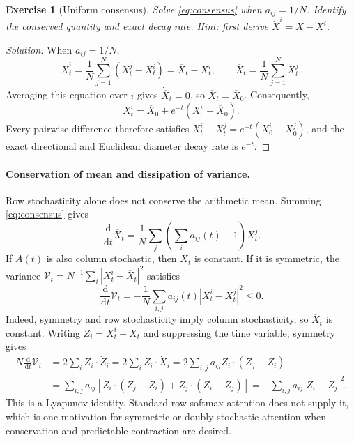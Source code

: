 \documentclass[11pt]{amsart}
\numberwithin{equation}{section}
\theoremstyle{plain}
\newtheorem{exercise}[theorem]{Exercise}
\newcommand{\dd}{\,\mathrm{d}}
\newcommand{\abs}[1]{\left\lvert#1\right\rvert}
\begin{document}
\begin{exercise}[Uniform consensus]
Solve \eqref{eq:consensus} when $a_{ij}=1/N$.  Identify the conserved quantity
and exact decay rate.  \emph{Hint:} first derive
$\dot X^i=\overline X-X^i$.
\end{exercise}
\begin{proof}[Solution]
When $a_{ij}=1/N$,
\[
 \dot X_t^i=\frac1N\sum_{j=1}^N(X_t^j-X_t^i)
 =\overline X_t-X_t^i,
 \qquad
 \overline X_t=\frac1N\sum_{j=1}^NX_t^j.
\]
Averaging this equation over $i$ gives $\dot{\overline X}_t=0$, so
$\overline X_t=\overline X_0$.  Consequently,
\begin{equation}\label{eq:uniform-consensus-solution}
 X_t^i=\overline X_0+e^{-t}(X_0^i-\overline X_0).
\end{equation}
Every pairwise difference therefore satisfies
$X_t^i-X_t^j=e^{-t}(X_0^i-X_0^j)$, and the exact directional and Euclidean
diameter decay rate is $e^{-t}$.
\end{proof}


\paragraph{\textbf{Conservation of mean and dissipation of variance.}}
Row stochasticity alone does not conserve the arithmetic mean.  Summing
\eqref{eq:consensus} gives
\begin{equation}\label{eq:mean-column-sum}
 \frac{\dd}{\dd t}\overline X_t
 =\frac1N\sum_j\left(\sum_i a_{ij}(t)-1\right)X_t^j.
\end{equation}
If $A(t)$ is also column stochastic, then $\overline X_t$ is constant.  If it
is symmetric, the variance
$\mathcal V_t=N^{-1}\sum_i\abs{X_t^i-\overline X_t}^2$ satisfies
\begin{equation}\label{eq:variance-dissipation}
 \frac{\dd}{\dd t}\mathcal V_t
 =-\frac1N\sum_{i,j}a_{ij}(t)\abs{X_t^i-X_t^j}^2\leq0.
\end{equation}
Indeed, symmetry and row stochasticity imply column stochasticity, so
$\overline X_t$ is constant.  Writing $Z_i=X_t^i-\overline X_t$ and suppressing
the time variable, symmetry gives
\begin{align*}
  N\frac{\dd}{\dd t}\mathcal V_t
  & = 2\sum_iZ_i\cdot\dot Z_i
    = 2\sum_iZ_i\cdot\dot X_i
    = 2\sum_{i,j}a_{ij}Z_i\cdot(Z_j-Z_i)  \\
  & =\sum_{i,j}a_{ij}\left[
 Z_i\cdot(Z_j-Z_i)+Z_j\cdot(Z_i-Z_j)\right]
 =-\sum_{i,j}a_{ij}\abs{Z_i-Z_j}^2.
\end{align*}
This is a Lyapunov identity.  Standard row-softmax attention does not supply
it, which is one motivation for symmetric or doubly-stochastic attention when
conservation and predictable contraction are desired.
\end{document}

